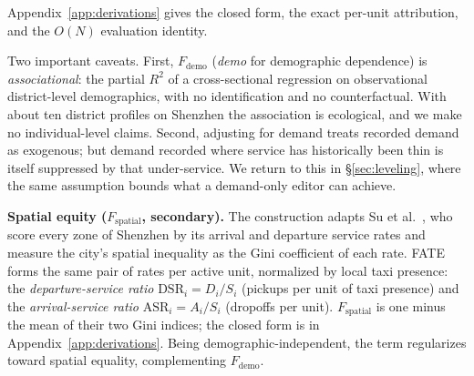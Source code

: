 Appendix~\ref{app:derivations} gives the closed form, the exact per-unit
attribution, and the $O(N)$ evaluation identity.

Two important caveats. First, $F_{\mathrm{demo}}$ (\emph{demo}
for demographic dependence) is \emph{associational}: the
partial $R^2$ of a cross-sectional regression on observational
district-level demographics, with no identification and no counterfactual.
With about ten district profiles on Shenzhen the association is ecological,
and we make no in\-di\-vid\-ual-level claims. Second, adjusting for demand treats
recorded demand as exogenous; but demand recorded where service has
historically been thin is itself suppressed by that under-service. We return
to this in \S\ref{sec:leveling}, where the same assumption bounds
what a demand-only editor can achieve.

\textbf{Spatial equity ($F_{\mathrm{spatial}}$, secondary).}
The construction adapts Su et al.~\cite{su2018taxigini}, who score every
zone of Shenzhen by its arrival and departure service rates and measure
the city's spatial inequality as the Gini coefficient of each rate. FATE forms the same pair
of rates per active unit, normalized by local taxi presence: the
\emph{departure-service ratio} $\mathrm{DSR}_i = D_i / S_i$ (pickups per
unit of taxi presence) and the \emph{arrival-service ratio}
$\mathrm{ASR}_i = A_i / S_i$ (dropoffs per unit). $F_{\mathrm{spatial}}$
is one minus the mean of their two Gini indices; the closed form is in
Appendix~\ref{app:derivations}. Being
demographic-independent, the term regularizes toward spatial equality,
complementing $F_{\mathrm{demo}}$.


